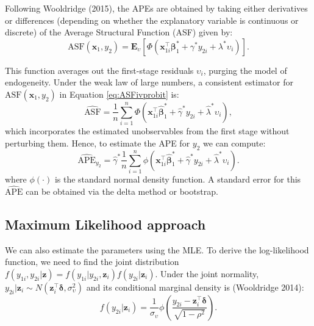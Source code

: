 Following Wooldridge (2015), the APEs are obtained by taking either derivatives or differences (depending on whether the explanatory variable is continuous or discrete) of the Average Structural Function (ASF) given by:
\begin{equation}
  \textrm{ASF}(\mathbf x_1, y_2) = \mathbf{E}_{\upsilon}\left[\Phi\left(\mathbf x_{1i}^\top\boldsymbol \beta_{1}^* + \gamma^* y_{2i}+ \lambda^*\upsilon_i\right)\right].
  \label{eq:ASFivprobit}
\end{equation}

This function averages out the first-stage residuals \(\upsilon_i\), purging the model of endogeneity. Under the weak law of large numbers, a consistent estimator for \(\textrm{ASF}(\mathbf x_1, y_2)\) in Equation \eqref{eq:ASFivprobit} is:
\begin{equation}
\widehat{\textrm{ASF}} = \frac{1}{n}\sum_{i=1}^n\Phi\left(\mathbf x_{1i}^\top\widehat{\boldsymbol \beta}_{1}^* + \widehat{\gamma}^* y_{2i}+ \widehat{\lambda}^*\upsilon_i\right),
\end{equation}
which incorporates the estimated unobservables from the first stage without perturbing them. Hence, to estimate the APE for \(y_2\) we can compute:
\begin{equation}
\widehat{\textrm{APE}}_{y_2} = \widehat{\gamma}^*\frac{1}{n}\sum_{i=1}^n\phi\left(\mathbf x_{1i}^\top\widehat{\boldsymbol \beta}_{1}^* + \widehat{\gamma}^* y_{2i}+ \widehat{\lambda}^*\upsilon_i\right).
\label{eq:apey2cf}
\end{equation}
where \(\phi(\cdot)\) is the standard normal density function. A standard error for this \(\widehat{\textrm{APE}}\) can be obtained via the delta method or bootstrap.

\hypertarget{maximum-likelihood-approach}{%
\subsection{Maximum Likelihood approach}\label{maximum-likelihood-approach}}

We can also estimate the parameters using the MLE. To derive the log-likelihood function, we need to find the joint distribution \(f(y_{1i}, y_{2i}|\mathbf z) = f(y_{1i}|y_{2i}, \mathbf z_i)f(y_{2i}|\mathbf z_i)\). Under the joint normality, \(y_{2i}|\mathbf z_i \sim N(\mathbf z_i^\top\boldsymbol \delta, \sigma_{\upsilon}^2)\) and its conditional marginal density is (Wooldridge 2014):
\begin{equation}
f(y_{2i}|\mathbf z_i) = \frac{1}{\sigma_{\upsilon}}\phi\left(\frac{y_{2i} -\mathbf z_i^\top\boldsymbol \delta}{\sqrt{1 - \rho^2}}\right).
\label{eq:marginal}
\end{equation}

